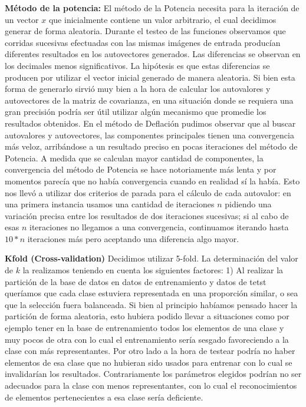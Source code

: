 \textbf{Método de la potencia:} El método de la Potencia necesita para la iteración de un vector $x$ que inicialmente contiene un valor arbitrario, el cual decidimos generar de forma aleatoria. Durante el testeo de las funciones observamos que corridas sucesivas efectuadas con las mismas imágenes de entrada producían diferentes resultados en los autovectores generados. Las diferencias se observan en los decimales menos significativos. La hipótesis es que estas diferencias se producen por utilizar el vector inicial generado de manera aleatoria. Si bien esta forma de generarlo sirvió muy bien a la hora de calcular los autovalores y autovectores de la matriz de covarianza, en una situación donde se requiera una gran precisión podría ser útil utilizar algún mecanismo que promedie los resultados obtenidos.
En el método de Deflación pudimos observar que al buscar autovalores y autovectores, las componentes principales tienen una convergencia más veloz, arribándose a un resultado preciso en pocas iteraciones del método de Potencia. A medida que se calculan mayor cantidad de componentes, la convergencia del método de Potencia se hace notoriamente más lenta y por momentos parecía que no había convergencia cuando en realidad sí la había. Esto nos llevó a utilizar dos criterios de parada para el cálculo de cada autovalor: en una primera instancia usamos una cantidad de iteraciones $n$ pidiendo una variación precisa entre los resultados de dos iteraciones sucesivas; si al cabo de esas $n$ iteraciones no llegamos a una convergencia, continuamos iterando hasta $10*n$ iteraciones más pero aceptando una diferencia algo mayor.


\textbf{Kfold (Cross-validation)}
Decidimos utilizar 5-fold.
La determinación del valor de $k$ la realizamos teniendo en cuenta los siguientes factores:
1) Al realizar la partición de la base de datos en datos de entrenamiento y datos de tetst queríamos que cada clase estuviera representada en una proporción similar, o sea que la selección fuera balanceada. Si bien al principio habíamos pensado hacer la partición de forma aleatoria, esto hubiera podido llevar a situaciones como por ejemplo tener en la base de entrenamiento todos los elementos de una clase y muy pocos de otra con lo cual el entrenamiento sería sesgado favoreciendo a la clase con más representantes. Por otro lado a la hora de testear podría no haber elementos de esa clase que no hubieran sido usados para entrenar con lo cual se invalidarían los resultados. Contrariamente los parámetros elegidos podrían no ser adecuados para la clase con menos representantes, con lo cual el reconocimientos de elementos pertenecientes a esa clase sería deficiente.

